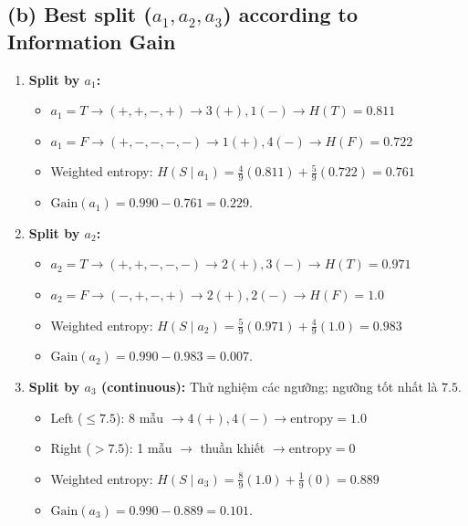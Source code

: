 \subsection*{(b) Best split ($a_1, a_2, a_3$) according to Information Gain}
\begin{enumerate}
    \item \textbf{Split by $a_1$:}
    \begin{itemize}
        \item $a_1 = T \rightarrow (+, +, -, +) \rightarrow 3(+), 1(-) \rightarrow H(T) = 0.811$
        \item $a_1 = F \rightarrow (+, -, -, -, -) \rightarrow 1(+), 4(-) \rightarrow H(F) = 0.722$
        \item Weighted entropy: $H(S \mid a_1) = \frac{4}{9}(0.811) + \frac{5}{9}(0.722) = 0.761$
        \item $\text{Gain}(a_1) = 0.990 - 0.761 = 0.229$.
    \end{itemize}

    \item \textbf{Split by $a_2$:}
    \begin{itemize}
        \item $a_2 = T \rightarrow (+, +, -, -, -) \rightarrow 2(+), 3(-) \rightarrow H(T) = 0.971$
        \item $a_2 = F \rightarrow (-, +, -, +) \rightarrow 2(+), 2(-) \rightarrow H(F) = 1.0$
        \item Weighted entropy: $H(S \mid a_2) = \frac{5}{9}(0.971) + \frac{4}{9}(1.0) = 0.983$
        \item $\text{Gain}(a_2) = 0.990 - 0.983 = 0.007$.
    \end{itemize}

    \item \textbf{Split by $a_3$ (continuous):} Thử nghiệm các ngưỡng; ngưỡng tốt nhất là $7.5$.
    \begin{itemize}
        \item Left ($\le 7.5$): 8 mẫu $\rightarrow 4(+), 4(-) \rightarrow \text{entropy} = 1.0$
        \item Right ($> 7.5$): 1 mẫu $\rightarrow$ thuần khiết $\rightarrow \text{entropy} = 0$
        \item Weighted entropy: $H(S \mid a_3) = \frac{8}{9}(1.0) + \frac{1}{9}(0) = 0.889$
        \item $\text{Gain}(a_3) = 0.990 - 0.889 = 0.101$.
    \end{itemize}
\end{enumerate}

